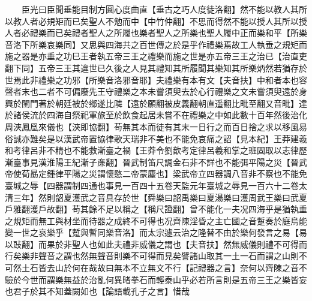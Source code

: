 　　臣光曰臣聞垂能目制方圓心度曲直【垂古之巧人度徒洛翻】然不能以教人其所以教人者必規矩而已矣聖人不勉而中【中竹仲翻】不思而得然不能以授人其所以授人者必禮樂而已矣禮者聖人之所履也樂者聖人之所樂也聖人履中正而樂和平【所樂音洛下所樂哀樂同】又思與四海共之百世傳之於是乎作禮樂焉故工人執垂之規矩而施之器是亦垂之功巳王者執五帝三王之禮樂而施之世是亦五帝三王之治已【治直吏翻下同】五帝三王其違世已久後之人見其禮知其所履聞其樂知其所樂炳然若猶存於世焉此非禮樂之功邪【所樂音洛邪音耶】夫禮樂有本有文【夫音扶】中和者本也容聲者末也二者不可偏廢先王守禮樂之本未嘗須臾去於心行禮樂之文未嘗須臾遠於身興於閨門著於朝廷被於鄉遂比隣【遠於願翻被皮義翻朝直遥翻比毗至翻又音毗】達於諸侯流於四海自祭祀軍旅至於飲食起居未嘗不在禮樂之中如此數十百年然後治化周浹鳳凰來儀也【浹即協翻】苟無其本而徒有其末一日行之而百日捨之求以移風易俗誠亦難矣是以漢武帝置協律歌天瑞非不美也不能免哀痛之詔【見本紀】王莽建羲和考律呂非不精也不能救漸臺之禍【王莽令劉歆考定律呂羲和掌之班固取以志律歷漸臺事見漢淮陽王紀漸子亷翻】晉武制笛尺調金石非不詳也不能弭平陽之災【晉武帝使荀勗定鍾律平陽之災謂懷愍二帝蒙塵也】梁武帝立四器調八音非不察也不能免臺城之辱【四器謂制四通也事見一百四十五卷天監元年臺城之辱見一百六十二卷太清三年】然則韶夏濩武之音具存於世【舜樂曰韶禹樂曰夏湯樂曰濩周武王樂曰武夏戶雅翻濩戶故翻】苟其餘不足以稱之【稱尺證翻】曾不能化一夫况四海乎是猶執垂之規矩而無工與材坐而待器之成終不可得也况齊陳淫昏之主亡國之音蹔奏於庭烏能變一世之哀樂乎【蹔與暫同樂音洛】而太宗遽云治之隆替不由於樂何發言之易【易以䜴翻】而果於非聖人也如此夫禮非威儀之謂也【夫音扶】然無威儀則禮不可得而行矣樂非聲音之謂也然無聲音則樂不可得而見矣譬諸山取其一土一石而謂之山則不可然土石皆去山於何在哉故曰無本不立無文不行【記禮器之言】奈何以齊陳之音不驗於今世而謂樂無益於治亂何異暏拳石而輕泰山乎必若所言則是五帝三王之樂皆妄也君子於其不知蓋闕如也【論語載孔子之言】惜哉

